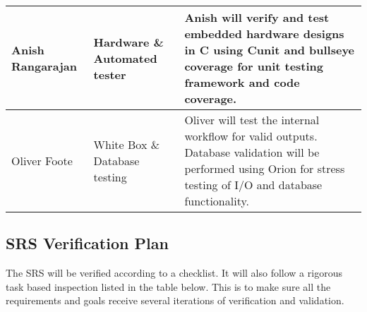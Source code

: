 \documentclass[12pt, titlepage]{article}
\begin{document}
\begin{center}
\begin{tabular}{|m{5em}|m{5em}|m{25em}|}
    \hline
    Anish Rangarajan         & Hardware \& Automated tester  & Anish will verify and test embedded hardware designs in C using Cunit and bullseye coverage for unit testing framework and code coverage.                                                                                                                      \\
    \hline
    Oliver Foote             & White Box \& Database testing & Oliver will test the internal workflow for valid outputs. Database validation will be performed using Orion for stress testing of I/O and database functionality.                                                                               \\
    \hline
  \end{tabular}
\end{center}

\subsection{SRS Verification Plan}\label{SRS_verification}

The SRS will be verified according to a checklist. It will also follow a rigorous task based inspection listed in the table below. This is to make sure all the requirements and goals receive several iterations of verification and validation.
\end{document}
